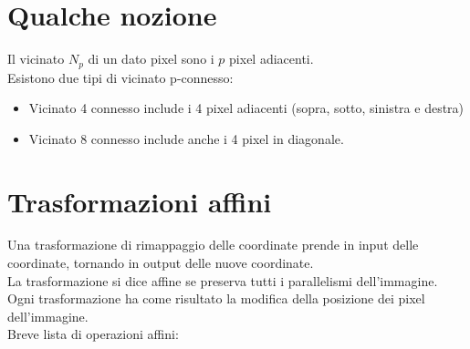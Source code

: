 \documentclass{report}
\begin{document}
\section{Qualche nozione}
Il vicinato $N_p$ di un dato pixel sono i $p$ pixel adiacenti.\\
Esistono due tipi di vicinato p-connesso:
\begin{itemize}
	\item Vicinato 4 connesso include i 4 pixel adiacenti (sopra, sotto, sinistra e destra)
	\item Vicinato 8 connesso include anche i 4 pixel in diagonale.
\end{itemize}
\section{Trasformazioni affini}
Una trasformazione di rimappaggio delle coordinate prende in input delle coordinate, tornando in output delle nuove coordinate.\\ La trasformazione si dice affine se preserva tutti i parallelismi dell'immagine. Ogni trasformazione ha come risultato la modifica della posizione dei pixel dell'immagine.\\
Breve lista di operazioni affini:
\end{document}
